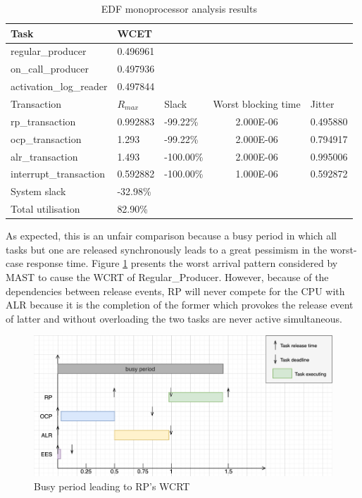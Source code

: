 \documentclass{article}
\begin{document}
\begin{table}[!htbp]
   \centering
   \begin{tabular}{lllcl}
    \toprule
    Task & WCET \\
    \midrule
    regular\_producer & 0.496961 \\
    on\_call\_producer & 0.497936 \\
    activation\_log\_reader & 0.497844 \\
    \toprule
    \toprule
    Transaction & $R_{max}$ & Slack & Worst blocking time & Jitter \\
    \midrule
    rp\_transaction        & 0.992883  & -99.22\%   & 2.000E-06  & 0.495880 \\
    ocp\_transaction       & 1.293     & -99.22\%   & 2.000E-06  & 0.794917 \\
    alr\_transaction       & 1.493     & -100.00\%  & 2.000E-06  & 0.995006 \\
    interrupt\_transaction & 0.592882  & -100.00\%  & 1.000E-06  & 0.592872 \\
    \toprule
    \toprule
    System slack & -32.98\% \\
    Total utilisation & 82.90\% \\
   \end{tabular}
   \caption{EDF monoprocessor analysis results}
   \label{tab:EDF-monoprocessor}
 \end{table}

As expected, this is an unfair comparison because a busy period in which all tasks but one are released synchronously leads to a great pessimism in the worst-case response time. Figure \ref{fig:timeline-WCRT-RP} presents the worst arrival pattern considered by MAST to cause the WCRT of Regular\_Producer. However, because of the dependencies between release events, RP will never compete for the CPU with ALR because it is the completion of the former which provokes the release event of latter and without overloading the two tasks are never active simultaneous.

\begin{figure}[!htbp]
   \centering
   \includegraphics[width=6in]{images/timelines-WCRT-RP}
   \caption{Busy period leading to RP's WCRT}
   \label{fig:timeline-WCRT-RP}
\end{figure}
\end{document}
